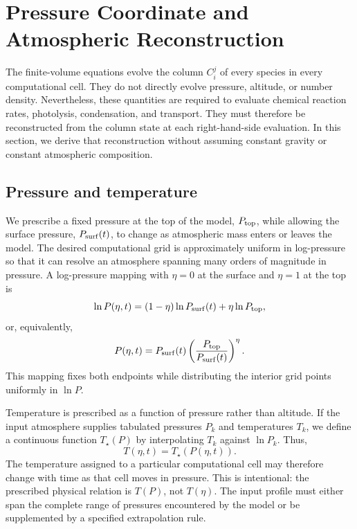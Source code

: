 \documentclass[twocolumn]{aastex631}
\begin{document}
\section{Pressure Coordinate and Atmospheric Reconstruction}
\label{sec:atmospheric_reconstruction}

The finite-volume equations evolve the column $C_i^j$ of every species in
every computational cell. They do not directly evolve pressure, altitude, or
number density. Nevertheless, these quantities are required to evaluate
chemical reaction rates, photolysis, condensation, and transport. They must
therefore be reconstructed from the column state at each right-hand-side
evaluation. In this section, we derive that reconstruction without assuming
constant gravity or constant atmospheric composition.

\subsection{Pressure and temperature}

We prescribe a fixed pressure at the top of the model, $P_{\rm top}$, while
allowing the surface pressure, $P_{\rm surf}(t)$, to change as atmospheric mass
enters or leaves the model. The desired computational grid is approximately
uniform in log-pressure so that it can resolve an atmosphere spanning many
orders of magnitude in pressure. A log-pressure mapping with $\eta=0$ at the
surface and $\eta=1$ at the top is
\begin{equation}
  \ln P(\eta,t)
  =
  (1-\eta)\ln P_{\rm surf}(t)
  +\eta\ln P_{\rm top},
  \label{eq:log_pressure_mapping}
\end{equation}
or, equivalently,
\begin{equation}
  P(\eta,t)
  =
  P_{\rm surf}(t)
  \left(\frac{P_{\rm top}}{P_{\rm surf}(t)}\right)^\eta .
  \label{eq:log_pressure_mapping_exponential}
\end{equation}
This mapping fixes both endpoints while distributing the interior grid points
uniformly in $\ln P$.

Temperature is prescribed as a function of pressure rather than altitude. If
the input atmosphere supplies tabulated pressures $P_k$ and temperatures
$T_k$, we define a continuous function $T_\star(P)$ by interpolating $T_k$
against $\ln P_k$. Thus,
\begin{equation}
  T(\eta,t)=T_\star\!\left(P(\eta,t)\right).
  \label{eq:temperature_pressure_mapping}
\end{equation}
The temperature assigned to a particular computational cell may therefore
change with time as that cell moves in pressure. This is intentional: the
prescribed physical relation is $T(P)$, not $T(\eta)$. The input profile must
either span the complete range of pressures encountered by the model or be
supplemented by a specified extrapolation rule.
\end{document}
